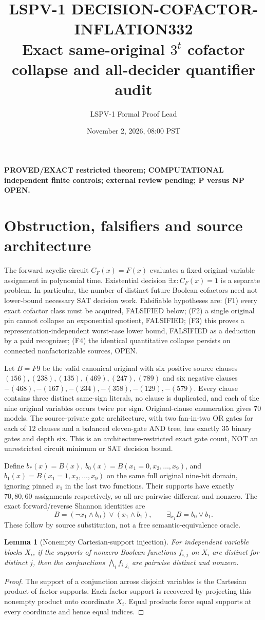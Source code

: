 \documentclass[11pt]{article}
\title{LSPV-1 DECISION-COFACTOR-INFLATION332\\Exact same-original $3^t$ cofactor collapse and all-decider quantifier audit}
\author{LSPV-1 Formal Proof Lead}
\date{November 2, 2026, 08:00 PST}
\newtheorem{lemma}{Lemma}
\begin{document}
\maketitle
\noindent\textbf{PROVED/EXACT restricted theorem; COMPUTATIONAL independent finite controls; external review pending; P versus NP OPEN.}

\section{Obstruction, falsifiers and source architecture}
The forward acyclic circuit $C_F(x)=F(x)$ evaluates a fixed original-variable assignment in polynomial time. Existential decision $\exists x:C_F(x)=1$ is a separate problem. In particular, the number of distinct future Boolean cofactors need not lower-bound necessary SAT decision work. Falsifiable hypotheses are: (F1) every exact cofactor class must be acquired, FALSIFIED below; (F2) a single original pin cannot collapse an exponential quotient, FALSIFIED; (F3) this proves a representation-independent worst-case lower bound, FALSIFIED as a deduction by a paid recognizer; (F4) the identical quantitative collapse persists on connected nonfactorizable sources, OPEN.

Let $B=F9$ be the valid canonical original with six positive source clauses $(156),(238),(135),(469),(247),(789)$ and six negative clauses $-(468),-(167),-(234),-(358),-(129),-(579)$. Every clause contains three distinct same-sign literals, no clause is duplicated, and each of the nine original variables occurs twice per sign. Original-clause enumeration gives $70$ models. The source-private gate architecture, with two fan-in-two OR gates for each of 12 clauses and a balanced eleven-gate AND tree, has exactly $35$ binary gates and depth six. This is an architecture-restricted exact gate count, NOT an unrestricted circuit minimum or SAT decision bound.

Define $b_*(x)=B(x)$, $b_0(x)=B(x_1=0,x_2,\ldots,x_9)$, and $b_1(x)=B(x_1=1,x_2,\ldots,x_9)$ on the same full original nine-bit domain, ignoring pinned $x_1$ in the last two functions. Their supports have exactly $70,80,60$ assignments respectively, so all are pairwise different and nonzero. The exact forward/reverse Shannon identities are
\[
B=(\neg x_1\land b_0)\lor(x_1\land b_1),\qquad \exists_{x_1}B=b_0\lor b_1.
\]
These follow by source substitution, not a free semantic-equivalence oracle.

\begin{lemma}[Nonempty Cartesian-support injection]
For independent variable blocks $X_i$, if the supports of nonzero Boolean functions $f_{i,j}$ on $X_i$ are distinct for distinct $j$, then the conjunctions $\bigwedge_i f_{i,j_i}$ are pairwise distinct and nonzero.
\end{lemma}
\begin{proof}
The support of a conjunction across disjoint variables is the Cartesian product of factor supports. Each factor support is recovered by projecting this nonempty product onto coordinate $X_i$. Equal products force equal supports at every coordinate and hence equal indices.
\end{proof}
\end{document}
